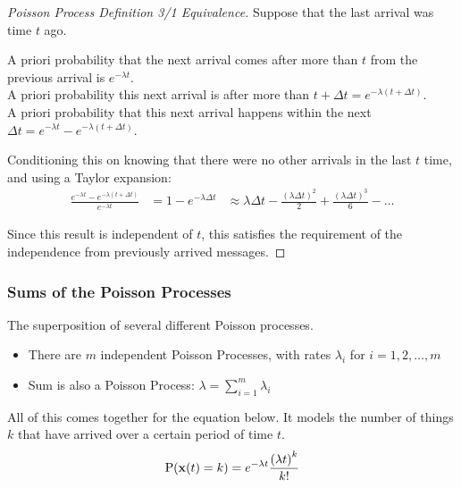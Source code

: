 \begin{proof}[Poisson Process Definition 3/1 Equivalence]\label{proof:Poisson_Process_Defn_3-1}
  Suppose that the last arrival was time $t$ ago.

  A priori probability that the next arrival comes after more than $t$ from the previous arrival is $e^{-\lambda t}$. \\
  A priori probability this next arrival is after more than $t + \Delta t = e^{-\lambda (t + \Delta t)}$. \\
  A priori probability that this next arrival happens within the next $\Delta t = e^{-\lambda t} - e^{-\lambda (t + \Delta t)}$.

  Conditioning this on knowing that there were no other arrivals in the last $t$ time, and using a Taylor expansion:
  \begin{align*}
    \frac{e^{-\lambda t} - e^{-\lambda (t + \Delta t)}}{e^{-\lambda t}} &= 1 - e^{-\lambda \Delta t}
                                                                          &\approx \lambda \Delta t - \frac{{(\lambda \Delta t)}^{2}}{2} + \frac{{(\lambda \Delta t)}^{3}}{6} - \ldots
  \end{align*}

  Since this result is independent of $t$, this satisfies the requirement of the independence from previously arrived messages.
\end{proof}

\subsubsection{Sums of the Poisson Processes}\label{subsubsec:Sums_Poisson_Process}
The superposition of several different Poisson processes.
\begin{itemize}[noitemsep]
\item There are $m$ independent Poisson Processes, with rates $\lambda_{i}$ for $i = 1, 2, \ldots, m$
\item Sum is also a Poisson Process: $\lambda = \sum\limits_{i=1}^{m} \lambda_{i}$
\end{itemize}

All of this comes together for the equation below.
It models the number of things $k$ that have arrived over a certain period of time $t$.
\begin{equation}\label{eq:Poisson_Probability_Num_Arrived_After_Time}
  \operatorname{\operatorname{P}}(\mathbf{x}(t) = k) = e^{-\lambda t} \frac{{(\lambda t)}^{k}}{k!}
\end{equation}

